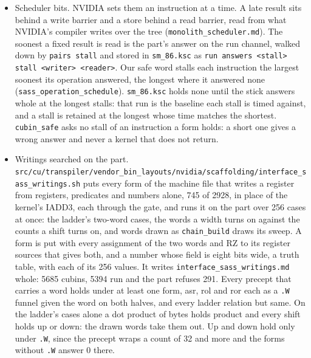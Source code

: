 \begin{enumerate}
\begin{itemize}
\texttt{sass.\allowbreak{}krs} uses and runs it on the part, its result moved to R8, its sources to registers holding distinct values and a predicate it sets read through \texttt{SEL}, and writes \texttt{interface\_\allowbreak{}sass\_\allowbreak{}fields.\allowbreak{}md} whole. A turned bit is put to the part only where its operation key holds forms in the machine file and no control transfer or wait among them; any other is marked skipped and run on nothing. Of the 75 forms, 1619 bits read inside a run the machine file records and 526 outside every run. The three branch forms name a label and are not asked.
\item Scheduler bits. NVIDIA sets them an instruction at a time. A late result sits behind a write barrier and a store behind a read barrier, read from what NVIDIA's compiler writes over the tree (\texttt{monolith\_\allowbreak{}scheduler.\allowbreak{}md}). The soonest a fixed result is read is the part's answer on the run channel, walked down by \texttt{pairs stall} and stored in \texttt{sm\_\allowbreak{}86.\allowbreak{}ksc} as \texttt{run answers <stall> stall <writer> <reader>}. Our safe word stalls each instruction the largest soonest its operation answered, the longest where it answered none (\texttt{sass\_\allowbreak{}operation\_\allowbreak{}schedule}). \texttt{sm\_\allowbreak{}86.\allowbreak{}ksc} holds none until the stick answers whole at the longest stalls: that run is the baseline each stall is timed against, and a stall is retained at the longest whose time matches the shortest. \texttt{cubin\_\allowbreak{}safe} asks no stall of an instruction a form holds: a short one gives a wrong answer and never a kernel that does not return.
\item Writings searched on the part. \texttt{src/\allowbreak{}cu/\allowbreak{}transpiler/\allowbreak{}vendor\_\allowbreak{}bin\_\allowbreak{}layouts/\allowbreak{}nvidia/\allowbreak{}scaffolding/\allowbreak{}interface\_\allowbreak{}sass\_\allowbreak{}writings.\allowbreak{}sh} puts every form of the machine file that writes a register from registers, predicates and numbers alone, 745 of 2928, in place of the kernel's IADD3, each through the gate, and runs it on the part over 256 cases at once: the ladder's two-word cases, the words a width turns on against the counts a shift turns on, and words drawn as \texttt{chain\_\allowbreak{}build} draws its sweep. A form is put with every assignment of the two words and RZ to its register sources that gives both, and a number whose field is eight bits wide, a truth table, with each of its 256 values. It writes \texttt{interface\_\allowbreak{}sass\_\allowbreak{}writings.\allowbreak{}md} whole: 5685 cubins, 5394 run and the part refuses 291. Every precept that carries a word holds under at least one form, asr, rol and ror each as a \texttt{.\allowbreak{}W} funnel given the word on both halves, and every ladder relation but same. On the ladder's cases alone a dot product of bytes holds product and every shift holds up or down: the drawn words take them out. Up and down hold only under \texttt{.\allowbreak{}W}, since the precept wraps a count of 32 and more and the forms without \texttt{.\allowbreak{}W} answer 0 there.

\end{itemize}
\end{enumerate}
